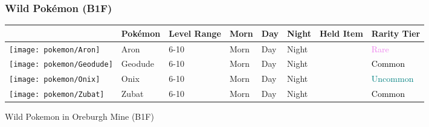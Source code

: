 \subsubsection{Wild Pokémon (B1F)}%
\label{ssubsec:WildPokmon(B1F)}%
\begin{longtable}{||l l l l l l l l||}%
\hline%
&Pokémon&Level Range&Morn&Day&Night&Held Item&Rarity Tier\\%
\hline%
\endhead%
\hline%
\texttt{[image: pokemon/Aron]}&Aron&6{-}10&Morn&Day&Night&&\textcolor{violet}{%
Rare%
}\\%
\hline%
\texttt{[image: pokemon/Geodude]}&Geodude&6{-}10&Morn&Day&Night&&\textcolor{black}{%
Common%
}\\%
\hline%
\texttt{[image: pokemon/Onix]}&Onix&6{-}10&Morn&Day&Night&&\textcolor{teal}{%
Uncommon%
}\\%
\hline%
\texttt{[image: pokemon/Zubat]}&Zubat&6{-}10&Morn&Day&Night&&\textcolor{black}{%
Common%
}\\%
\hline%
\end{longtable}%
\caption{Wild Pokemon in Oreburgh Mine (B1F)}